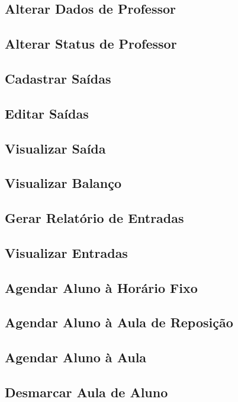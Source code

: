 \subsection[Alterar Dados de Professor]{Alterar Dados de Professor}
\subsection[Alterar Status de Professor]{Alterar Status de Professor}
\subsection[Cadastrar Saídas]{Cadastrar Saídas}
\subsection[Editar Saídas]{Editar Saídas}
\subsection[Visualizar Saída]{Visualizar Saída}
\subsection[Visualizar Balanço]{Visualizar Balanço}
\subsection[Gerar Relatório de Entradas]{Gerar Relatório de Entradas}
\subsection[Visualizar Entradas]{Visualizar Entradas}
\subsection[Agendar Aluno à Horário Fixo]{Agendar Aluno à Horário Fixo}
\subsection[Agendar Aluno à Aula de Reposição]{Agendar Aluno à Aula de Reposição}
\subsection[Agendar Aluno à Aula]{Agendar Aluno à Aula}
\subsection[Desmarcar Aula de Aluno]{Desmarcar Aula de Aluno}
